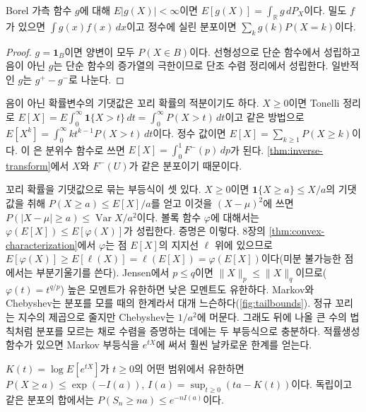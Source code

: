 \begin{proposition}
\label{prop:lotus}
Borel 가측 함수 $g$에 대해 $E|g(X)|<\infty$이면 $E[g(X)]=\int_{\mathbb R}g\,dP_X$이다. 밀도 $f$가 있으면 $\int g(x)f(x)\,dx$이고 정수에 실린 분포이면 $\sum_kg(k)P(X=k)$이다.
\end{proposition}

\begin{proof}
$g=\mathbf 1_B$이면 양변이 모두 $P(X\in B)$이다. 선형성으로 단순 함수에서 성립하고 음이 아닌 $g$는 단순 함수의 증가열의 극한이므로 단조 수렴 정리에서 성립한다. 일반적인 $g$는 $g^+-g^-$로 나눈다.
\end{proof}

음이 아닌 확률변수의 기댓값은 꼬리 확률의 적분이기도 하다. $X\ge0$이면 Tonelli 정리로 $E[X]=E\int_0^\infty\mathbf 1\{X>t\}\,dt=\int_0^\infty P(X>t)\,dt$이고 같은 방법으로 $E[X^k]=\int_0^\infty kt^{k-1}P(X>t)\,dt$이다. 정수 값이면 $E[X]=\sum_{k\ge1}P(X\ge k)$이다. 이 은 분위수 함수로 쓰면 $E[X]=\int_0^1F^{-}(p)\,dp$가 된다. \cref{thm:inverse-transform}에서 $X$와 $F^{-}(U)$가 같은 분포이기 때문이다.

꼬리 확률을 기댓값으로 묶는 부등식이 셋 있다. $X\ge0$이면 $\mathbf 1\{X\ge a\}\le X/a$의 기댓값을 취해  $P(X\ge a)\le E[X]/a$를 얻고 이것을 $(X-\mu)^2$에 쓰면  $P(|X-\mu|\ge a)\le\operatorname{Var}X/a^2$이다. 볼록 함수 $\varphi$에 대해서는  $\varphi(E[X])\le E[\varphi(X)]$가 성립한다. 증명은 이렇다. 8장의 \cref{thm:convex-characterization}에서 $\varphi$는 점 $E[X]$의 지지선 $\ell$ 위에 있으므로 $E[\varphi(X)]\ge E[\ell(X)]=\ell(E[X])=\varphi(E[X])$이다(미분 불가능한 점에서는 부분기울기를 쓴다). Jensen에서 $p\le q$이면 $\|X\|_p\le\|X\|_q$이므로($\varphi(t)=t^{q/p}$) 높은 모멘트가 유한하면 낮은 모멘트도 유한하다. Markov와 Chebyshev는 분포를 모를 때의 한계라서 대개 느슨하다(\cref{fig:tailbounds}). 정규 꼬리는 지수의 제곱으로 줄지만 Chebyshev는 $1/a^2$에 머문다. 그래도 뒤에 나올 큰 수의 법칙처럼 분포를 모르는 채로 수렴을 증명하는 데에는 두 부등식으로 충분하다. 적률생성함수가 있으면 Markov 부등식을 $e^{tX}$에 써서 훨씬 날카로운 한계를 얻는다.

\begin{proposition}[Chernoff]
\label{prop:chernoff}
$K(t)=\log E[e^{tX}]$가 $t\ge0$의 어떤 범위에서 유한하면 $P(X\ge a)\le\exp(-I(a))$, $I(a)=\sup_{t\ge0}(ta-K(t))$이다. 독립이고 같은 분포의 합에서는 $P(S_n\ge na)\le e^{-nI(a)}$이다.
\end{proposition}

